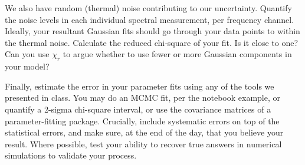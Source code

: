 \documentclass[11pt,preprint]{aastex}
\begin{document}
We also have random (thermal) noise contributing to our uncertainty.
Quantify the noise levels in each individual spectral measurement, per frequency
channel. Ideally, your resultant Gaussian fits should go through your
data points to within the thermal noise. Calculate the reduced chi-square
of your fit. Is it close to one? Can you use $\chi_r$ to argue whether
to use fewer or more Gaussian components in your model?

Finally, estimate the error in your parameter fits using any of the tools
we presented in class. You may do an MCMC fit, per the notebook example,
or quantify a 2-sigma chi-square interval, or use the covariance matrices
of a parameter-fitting package. Crucially, include systematic errors on
top of the statistical errors, and make sure, at the end of the day, that you believe
your result. Where possible, test 
your ability to recover true answers in numerical simulations to validate your process.
\end{document}
